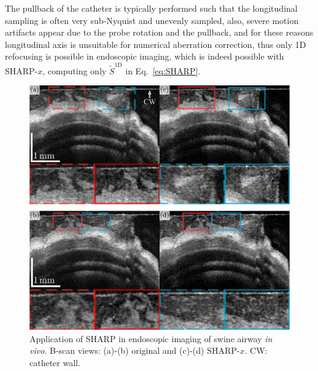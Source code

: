 The pullback of the catheter is typically performed such that the longitudinal sampling is often very sub-Nyquist and unevenly sampled, also, severe motion artifacts appear due to the probe rotation and the pullback, and for these reasons longitudinal axis is unsuitable for numerical aberration correction, thus only 1D refocusing is possible in endoscopic imaging, which is indeed possible with SHARP-$x$, computing only $\tilde{S}^{\text{1D}}$ in Eq.~\eqref{eq:SHARP}.

\begin{figure}[b!]
	\centering
	\includegraphics[width=.9\textwidth]{Figures/Results/CatheterImaging.pdf}
	\caption[Application of SHARP in endoscopic imaging of swine airway \textit{in vivo}.]{Application of SHARP in endoscopic imaging of swine airway \textit{in vivo}. B-scan views: (a)-(b) original and (c)-(d) SHARP-$x$. CW: catheter wall.}
	\label{fig:CatheterImaging}
\end{figure}

